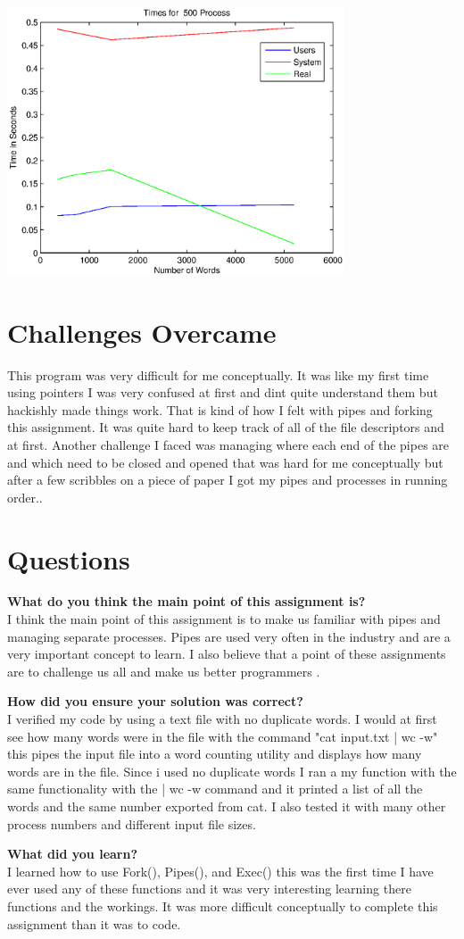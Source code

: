 \documentclass[letterpaper,10pt,notitlepage,fleqn]{article}
\begin{document}
\centerline{\includegraphics[width=0.75\textwidth]{process_500.eps}}


\section*{Challenges Overcame}
This program was very difficult for me conceptually. It was like my first time using pointers I was very confused
at first and dint quite understand them but hackishly made things work. That is kind of how I felt with pipes and
forking this assignment. It was quite hard to keep track of all of the file descriptors and at first. Another
challenge I faced was managing where each end of the pipes are and which need to be closed and opened that was
hard for me conceptually but after a few scribbles on a piece of paper I got my pipes and processes in running
order.. 
\section*{Questions}

\textbf{What do you think the main point of this assignment is?}\\
I think the main point of this assignment is to make us familiar with pipes and managing separate processes.
Pipes are used very often in the industry and are a very important concept to learn. I also believe that a point
of these assignments are to challenge us all and make us better programmers .
    
\textbf{How did you ensure your solution was correct?}\\
I verified my code by using a text file with no duplicate words. I would at first see how many words were in the
file with the command "cat input.txt | wc -w" this pipes the input file into a word counting utility and displays
how many words are in the file. Since i used no duplicate words I ran a my function with the same functionality
with the | wc -w command and it printed a list of all the words  and the same number exported from cat. I also
tested it with many other process numbers and different input file sizes. 
    
\textbf{What did you learn?}\\
I learned how to use Fork(), Pipes(), and Exec() this was the first time I have ever used any of these functions
and it was very interesting learning there functions and the workings. It was more difficult conceptually to
complete this assignment than it was to code.
    
\end{document}
